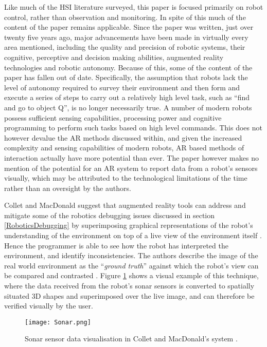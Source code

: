 Like much of the HSI literature surveyed, this paper \cite{Milgram:1993} is focused primarily on robot control, rather than observation and monitoring. In spite of this much of the content of the paper remains applicable. Since the paper was written, just over twenty five years ago, major advancements have been made in virtually every area mentioned, including the quality and precision of robotic systems, their cognitive, perceptive and decision making abilities, augmented reality technologies and robotic autonomy. Because of this, some of the content of the paper has fallen out of date. Specifically, the assumption that robots lack the level of autonomy required to survey their environment and then form and execute a series of steps to carry out a relatively high level task, such as ``find and go to object Q''\cite{Milgram:1993}, is no longer necessarily true. A number of modern robots possess sufficient sensing capabilities, processing power and cognitive programming to perform such tasks based on high level commands. This does not however devalue the AR methods discussed within, and given the increased complexity and sensing capabilities of modern robots, AR based methods of interaction actually have more potential than ever. The paper however makes no mention of the potential for an AR system to report data from a robot's sensors visually, which may be attributed to the technological limitations of the time rather than an oversight by the authors.

Collet and MacDonald \cite{Collet:2006} suggest that augmented reality tools can address and mitigate some of the robotics debugging issues discussed in section \ref{RoboticsDebugging} by superimposing graphical representations of the robot's understanding of the environment on top of a live view of the environment itself \cite{Collet:2006}. Hence the programmer is able to see how the robot has interpreted the environment, and identify inconsistencies. The authors describe the image of the real world environment as the ``\textit{ground truth}'' against which the robot's view can be compared and contrasted \cite{Collet:2006}. Figure \ref{fig:Sonar} shows a visual example of this technique, where the data received from the robot's sonar sensors is converted to spatially situated 3D shapes and superimposed over the live image, and can therefore be verified visually by the user.

\begin{figure}
	\begin{center}
	\texttt{[image: Sonar.png]}
	\decoRule
	\caption[Sonar data visualisation. Collet and MacDonald \cite{Collet:2006}]{Sonar sensor data visualisation in Collet and MacDonald's system \cite{Collet:2006}.}
	\label{fig:Sonar}
	\end{center}
\end{figure}

